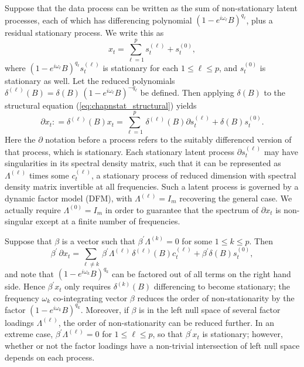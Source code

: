 \documentclass[a4paper]{book}
\begin{document}
Suppose that the data process can be written as the sum of
 non-stationary latent processes, each of which has differencing
 polynomial ${(1 - e^{i \omega_{\ell}} B )}^{q_{\ell}}$, plus a
 residual stationary process.  We write this as
\begin{equation}
 \label{eq:chapnstat_structural}
 x_t = \sum_{\ell=1}^p s^{(\ell)}_t + s^{(0)}_t,
\end{equation}
 where ${(1 - e^{i \omega_{\ell}} B )}^{q_{\ell}} s^{(\ell)}_t$ is
 stationary for each $1 \leq \ell \leq p$, and $s^{(0)}_t$ is
 stationary as well.  Let the
 reduced polynomials $\delta^{(\ell)} (B) = \delta (B) \, {(1 -
 e^{i \omega_{\ell}} B )}^{-q_{\ell}}$ be defined.  Then applying
 $\delta (B)$ to the structural equation (\ref{eq:chapnstat_structural}) yields
\[
 \partial x_t  : = \delta^{(\ell)} (B) x_t = \sum_{\ell=1}^p \, \delta^{(\ell)} (B) \partial
 s^{(\ell)}_t + \delta (B) s^{(0)}_t.
\]
 Here the $\partial$ notation before a process refers to the
 suitably differenced version of that process, which is stationary.
  Each stationary latent process $\partial s^{(\ell)}_t$ may have
  singularities in its spectral density matrix, such that it can be
  represented as $\Lambda^{(\ell)}$ times some $c^{(\ell)}_t$, a
 stationary process of reduced dimension with spectral density
 matrix invertible at all frequencies.  Such a latent process is
 governed by a dynamic factor model (DFM), with $\Lambda^{(\ell)} =
 I_m$ recovering the general case.  We actually require
 $\Lambda^{(0)} = I_m$ in order to guarantee that the spectrum of
 $\partial x_t$ is non-singular except at a finite number of
 frequencies.

 Suppose that $\beta$ is a vector such that $\beta^{\prime}
 \Lambda^{(k)} = 0$ for some $1 \leq k \leq p$.  Then
\[
 \beta^{\prime} \, \partial x_t = \sum_{\ell \neq k} \,
 \beta^{\prime} \Lambda^{(\ell)} \, \delta^{(\ell)} (B)
 c^{(\ell)}_t + \beta^{\prime} \delta (B) s^{(0)}_t,
\]
 and note that ${(1 - e^{i \omega_{k}} B )}^{q_{k}}$ can be factored
 out of all terms on the right hand side.  Hence $\beta^{\prime}
 x_t$ only requires $\delta^{(k)} (B)$ differencing to become
 stationary; the frequency $\omega_k$ co-integrating vector $\beta$
 reduces the order of non-stationarity by the factor ${(1 - e^{i \omega_{k}} B
 )}^{q_{k}}$.  Moreover, if $\beta$ is in the left null space of
 several factor loadings $\Lambda^{(\ell)}$, the order of
 non-stationarity can be reduced further.  In an extreme case,
 $\beta^{\prime} \Lambda^{(\ell)} = 0$ for $1 \leq \ell \leq p$, so
 that $\beta^{\prime} x_t$ is stationary; however, whether or not
 the factor loadings have a non-trivial intersection of left null
 space depends on each process.
\end{document}
